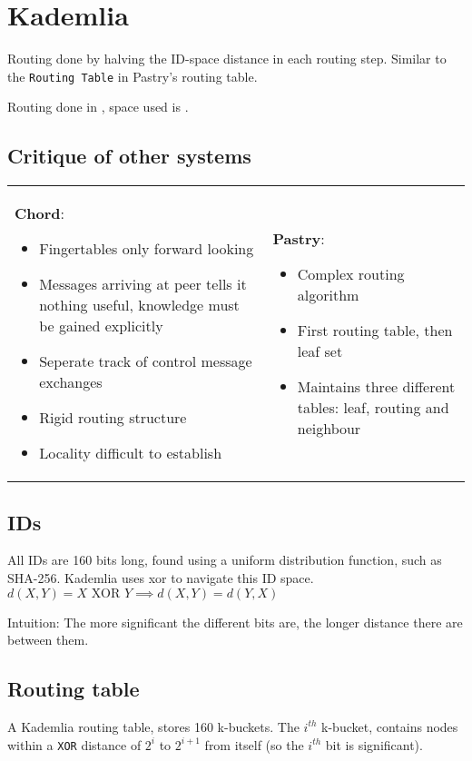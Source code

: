 	\section{Kademlia}
	Routing done by halving the ID-space distance in each routing step. Similar to the \texttt{Routing Table} in Pastry's routing table.
	
	Routing done in , space used is .
	
	\subsection{Critique of other systems}
	\begin{tabular}{p{} | p{}}
		\textbf{Chord}:
		\begin{itemize}
			\item Fingertables only forward looking
			\item Messages arriving at peer tells it nothing useful, knowledge must be gained explicitly
			\item Seperate track of control message exchanges
			\item Rigid routing structure
			\item Locality difficult to establish
		\end{itemize}
		&
		\textbf{Pastry}:
		\begin{itemize}
			\item Complex routing algorithm
			\item First routing table, then leaf set
			\item Maintains three different tables: leaf, routing and neighbour
		\end{itemize}
	\end{tabular}
	
	\subsection{IDs}
	All IDs are 160 bits long, found using a uniform distribution function, such as SHA-256. Kademlia uses xor to navigate this ID space. $d(X, Y) = X \text{ XOR } Y \implies d(X, Y) = d(Y, X)$
	
	Intuition: The more significant the different bits are, the longer distance there are between them.
	
	\subsection{Routing table}
	A Kademlia routing table, stores 160 k-buckets. The $i^{th}$ k-bucket, contains nodes within a \texttt{XOR} distance of $2^i$ to $2^{i+1}$ from itself (so the $i^{th}$ bit is significant).
	
